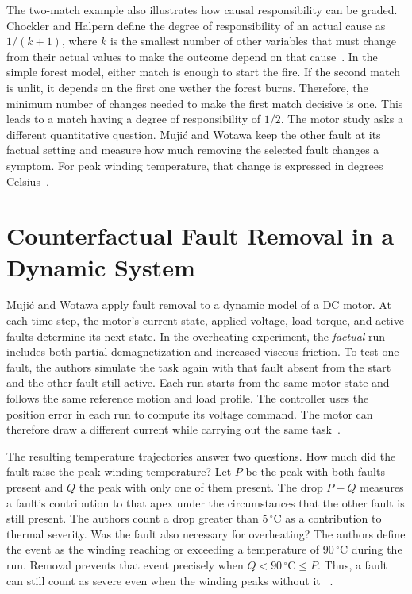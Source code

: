 \documentclass[runningheads]{llncs}
\begin{document}
The two-match example also illustrates how causal responsibility can be graded. 
Chockler and Halpern define the degree of responsibility of an actual cause as 
\(1/(k+1)\), where \(k\) is the smallest number of other variables that must change 
from their actual values to make the outcome depend on that cause~\cite[Def.~3.2]{chockler2004}. 
In the simple forest model, either match is enough to start the fire.
If the second match is unlit, it depends on the first one wether the forest burns.
Therefore, the minimum number of changes needed to make the first match decisive is one.
This leads to  a match having a degree of responsibility of \(1/2\).
The motor study asks a different quantitative question. 
Mujić and Wotawa keep the other fault at its factual setting and measure how 
much removing the selected fault changes a symptom. For peak winding temperature, 
that change is expressed in degrees Celsius~\cite[Sect.~3.3, Eq.~(13)]{mujic2026}.

\section{Counterfactual Fault Removal in a Dynamic System}
Muji\'{c} and Wotawa apply fault removal to a dynamic model of a DC motor.
At each time step, the motor's current state, applied voltage, load torque,
and active faults determine its next state. In the overheating experiment,
the \emph{factual} run includes both partial demagnetization and increased
viscous friction. To test one fault, the authors simulate the task again
with that fault absent from the start and the other fault still active.
Each run starts from the same motor state and follows the same reference
motion and load profile. The controller uses the position error in each
run to compute its voltage command. The motor can therefore draw a
different current while carrying out the same task~\cite[Sects.~3.3
and~4.2]{mujic2026}.

The resulting temperature trajectories answer two questions. How much did
the fault raise the peak winding temperature? Let \(P\) be the peak with
both faults present and \(Q\) the peak with only one of them present. The
drop \(P-Q\) measures a fault's contribution to that apex under the circumstances 
that the other fault is still present. The authors count a drop greater than
\(5\,^{\circ}\mathrm{C}\) as a contribution to thermal severity. Was the
fault also necessary for overheating? The authors define the event as the
winding reaching or exceeding a temperature of \(90\,^{\circ}\mathrm{C}\) during the run.
Removal prevents that event precisely when \(Q < 90\,^{\circ}\mathrm{C} \leq P\).
Thus, a fault can still count as severe even when the winding peaks without it
~\cite[Sect.~4.2, Eqs.~(18)--(19)]{mujic2026}.
\end{document}
